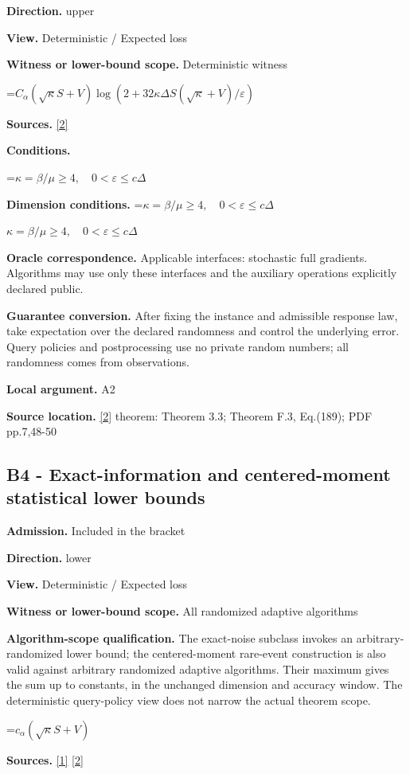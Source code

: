 \documentclass[10pt,a4paper]{article}
\newcommand{\AtlasMath}[1]{\par\begingroup\centering\setbox0=\hbox{$\displaystyle #1$}\ifdim\wd0>1.4\linewidth\typeout{ATLAS WIDE FORMULA: \the\wd0}\fi\ifdim\wd0>\linewidth\resizebox{\linewidth}{!}{\box0}\else\box0\fi\par\endgroup}
\newcommand{\AtlasInlineMath}[1]{\begingroup\setbox0=\hbox{$#1$}\ifdim\wd0>.4\linewidth\endgroup\AtlasMath{#1}\else\endgroup$#1$\fi}
\begin{document}
\textbf{Direction.} upper

\textbf{View.} Deterministic / Expected loss

\textbf{Witness or lower-bound scope.} Deterministic witness

\AtlasMath{C_\alpha(\sqrt\kappa S+V)\log(2+32\kappa\Delta S(\sqrt\kappa+V)/\varepsilon)}
\textbf{Sources.} \href{https://proceedings.mlr.press/v202/sadiev23a/sadiev23a.pdf}{[2]}

\textbf{Conditions.} 
\AtlasMath{\kappa=\beta/\mu\ge4,\quad0<\varepsilon\le c\Delta}


\textbf{Dimension conditions.} \AtlasInlineMath{\kappa=\beta/\mu\ge4,\quad0<\varepsilon\le c\Delta}

\textbf{Oracle correspondence.} Applicable interfaces: stochastic full gradients. Algorithms may use only these interfaces and the auxiliary operations explicitly declared public.

\textbf{Guarantee conversion.} After fixing the instance and admissible response law, take expectation over the declared randomness and control the underlying error. Query policies and postprocessing use no private random numbers; all randomness comes from observations.

\textbf{Local argument.} A2

\textbf{Source location.} \href{https://proceedings.mlr.press/v202/sadiev23a/sadiev23a.pdf}{[2]} theorem: Theorem 3.3; Theorem F.3, Eq.(189); PDF pp.7,48-50

\subsection{B4 - Exact-information and centered-moment statistical lower bounds}
\textbf{Admission.} Included in the bracket

\textbf{Direction.} lower

\textbf{View.} Deterministic / Expected loss

\textbf{Witness or lower-bound scope.} All randomized adaptive algorithms

\textbf{Algorithm-scope qualification.} The exact-noise subclass invokes an arbitrary-randomized lower bound; the centered-moment rare-event construction is also valid against arbitrary randomized adaptive algorithms. Their maximum gives the sum up to constants, in the unchanged dimension and accuracy window. The deterministic query-policy view does not narrow the actual theorem scope.

\AtlasMath{c_\alpha(\sqrt\kappa S+V)}
\textbf{Sources.} \href{https://arxiv.org/pdf/2609.10874}{[1]} \href{https://proceedings.mlr.press/v202/sadiev23a/sadiev23a.pdf}{[2]}
\end{document}
